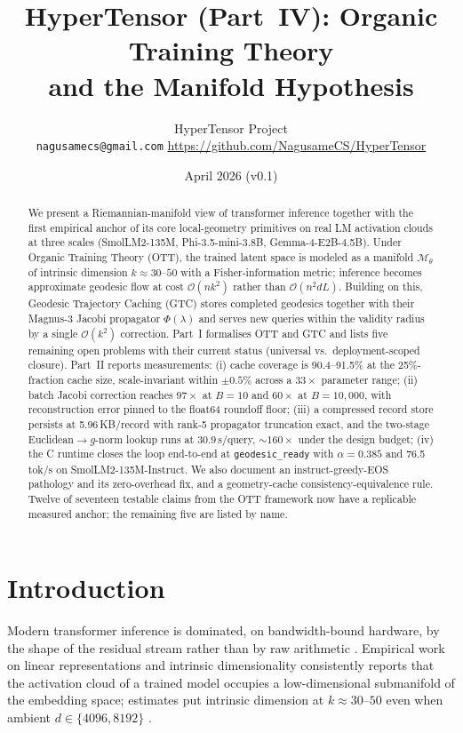 \documentclass[11pt]{article}
\title{HyperTensor (Part~IV): Organic Training Theory\\and the Manifold Hypothesis}
\author{HyperTensor Project\\[2pt]
\small \texttt{nagusamecs@gmail.com} \quad \url{https://github.com/NagusameCS/HyperTensor}}
\date{April 2026 (v0.1)}
\begin{document}
\maketitle
\hypertensorbanner

\begin{abstract}
We present a Riemannian-manifold view of transformer inference together with the
first empirical anchor of its core local-geometry primitives on real LM activation
clouds at three scales (SmolLM2-135M, Phi-3.5-mini-3.8B, Gemma-4-E2B-4.5B).
Under Organic Training Theory (OTT), the trained latent space is modeled as
a manifold $\mathcal{M}_\theta$ of intrinsic dimension $k\!\approx\!30$--$50$ with
a Fisher-information metric; inference becomes approximate geodesic flow at
cost $\mathcal{O}(nk^2)$ rather than $\mathcal{O}(n^2 dL)$.
Building on this, Geodesic Trajectory Caching (GTC) stores completed
geodesics together with their Magnus-3 Jacobi propagator $\Phi(\lambda)$ and
serves new queries within the validity radius by a single $\mathcal{O}(k^2)$
correction. Part~I formalises OTT and GTC and lists five remaining open
problems with their current status (universal vs.\ deployment-scoped closure).
Part~II reports measurements: (i) cache coverage is
90.4--91.5\% at the 25\%-fraction cache size, scale-invariant within
$\pm 0.5\%$ across a $33\times$ parameter range; (ii) batch Jacobi correction
reaches $97\times$ at $B=10$ and $60\times$ at $B=10{,}000$, with
reconstruction error pinned to the float64 roundoff floor; (iii) a compressed
record store persists at 5.96\,KB/record with rank-5 propagator
truncation exact, and the two-stage Euclidean$\to g$-norm lookup runs at
30.9\,\textmu s/query, $\sim\!160\times$ under the design budget; (iv)
the C runtime closes the loop end-to-end at \texttt{geodesic\_ready} with
$\alpha=0.385$ and 76.5\,tok/s on SmolLM2-135M-Instruct. We also document an
instruct-greedy-EOS pathology and its zero-overhead fix, and a
geometry-cache consistency-equivalence rule. Twelve of seventeen testable
claims from the OTT framework now have a replicable measured anchor; the
remaining five are listed by name.
\end{abstract}

\vspace{6pt}
\section{Introduction}

Modern transformer inference is dominated, on bandwidth-bound hardware, by the
shape of the residual stream rather than by raw arithmetic
\cite{vaswani2017attention,llama3,williams2009roofline}. Empirical work on
linear representations and intrinsic dimensionality consistently reports that
the activation cloud of a trained model occupies a low-dimensional submanifold
of the embedding space; estimates put intrinsic dimension at $k\!\approx\!30$--$50$
even when ambient $d\in\{4096,8192\}$
\cite{elhage2022superposition,nakkiran2021deep}.
\end{document}
